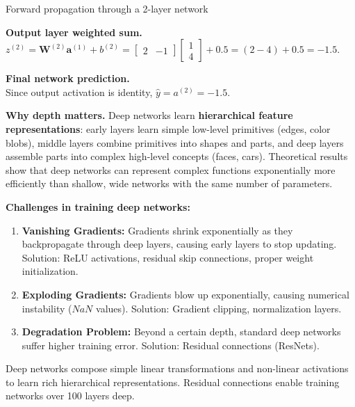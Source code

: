 \documentclass[a4paper,11pt]{article}
\newcommand{\vocab}[1]{\textbf{\color{navy}#1}}
\begin{document}
\begin{worked}{Forward propagation through a 2-layer network}
\begin{steps}
  \item \textbf{Output layer weighted sum.} \\
        $z^{(2)} = \mathbf{W}^{(2)} \mathbf{a}^{(1)} + b^{(2)} = \begin{bmatrix} 2 & -1 \end{bmatrix} \begin{bmatrix} 1 \\ 4 \end{bmatrix} + 0.5 = (2 - 4) + 0.5 = -1.5$.
  \item \textbf{Final network prediction.} \\
        Since output activation is identity, $\hat{y} = a^{(2)} = -1.5$.
\end{steps}
\end{worked}

\noindent\textbf{Why depth matters.}
Deep networks learn \vocab{hierarchical feature representations}: early layers learn simple low-level primitives (edges, color blobs), middle layers combine primitives into shapes and parts, and deep layers assemble parts into complex high-level concepts (faces, cars).
Theoretical results show that deep networks can represent complex functions exponentially more efficiently than shallow, wide networks with the same number of parameters.

\noindent\textbf{Challenges in training deep networks:}
\begin{enumerate}[leftmargin=1.5em]
  \item \textbf{Vanishing Gradients:} Gradients shrink exponentially as they backpropagate through deep layers, causing early layers to stop updating. Solution: ReLU activations, residual skip connections, proper weight initialization.
  \item \textbf{Exploding Gradients:} Gradients blow up exponentially, causing numerical instability ($NaN$ values). Solution: Gradient clipping, normalization layers.
  \item \textbf{Degradation Problem:} Beyond a certain depth, standard deep networks suffer higher training error. Solution: Residual connections (ResNets).
\end{enumerate}

\begin{keytake}
Deep networks compose simple linear transformations and non-linear activations to learn rich hierarchical representations. Residual connections enable training networks over 100 layers deep.
\end{keytake}
\end{document}
